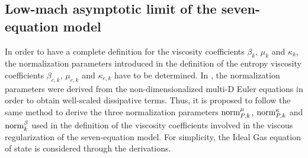 \subsection{Low-mach asymptotic limit of the seven-equation model}\label{sec:low-Mach-sem}
In order to have a complete definition for the viscosity coefficients $\beta_k$, $\mu_k$ and $\kappa_k$, the normalization parameters introduced in the definition of the entropy viscosity coefficients $\beta_{e,k}$, $\mu_{e,k}$ and $\kappa_{e,k}$ have to be determined. In , the normalization parameters were derived from the non-dimensionalized multi-D Euler equations in order to obtain well-scaled dissipative terms. Thus, it is proposed to follow the same method to derive the three normalization parameters $\textrm{norm}_{P,k}^\mu$, $\textrm{norm}_{P,k}^\kappa$ and $\textrm{norm}_{k}^\beta$ used in the definition of the viscosity coefficients involved in the viscous regularization of the seven-equation model. For simplicity, the Ideal Gas equation of state is considered through the derivations.

